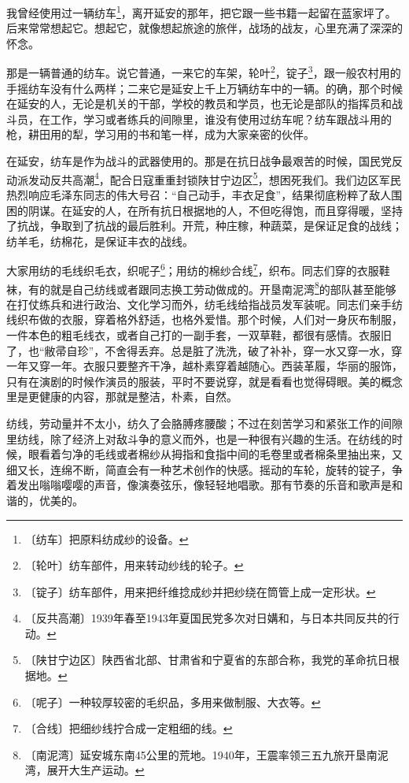\documentclass[12pt,UTF-8,openany]{ctexbook}
\begin{document}
\begin{large}
    
    我曾经使用过一辆纺车\footnote{〔纺车〕把原料纺成纱的设备。}，离开延安的那年，把它跟一些书籍一起留在蓝家坪了。后来常常想起它。想起它，就像想起旅途的旅伴，战场的战友，心里充满了深深的怀念。
    
    那是一辆普通的纺车。说它普通，一来它的车架，轮叶\footnote{〔轮叶〕纺车部件，用来转动纱线的轮子。}，锭子\footnote{〔锭子〕纺车部件，用来把纤维捻成纱并把纱绕在筒管上成一定形状。}，跟一般农村用的手摇纺车没有什么两样；二来它是延安上千上万辆纺车中的一辆。的确，那个时候在延安的人，无论是机关的干部，学校的教员和学员，也无论是部队的指挥员和战斗员，在工作，学习或者练兵的间隙里，谁没有使用过纺车呢？纺车跟战斗用的枪，耕田用的犁，学习用的书和笔一样，成为大家亲密的伙伴。
    
    在延安，纺车是作为战斗的武器使用的。那是在抗日战争最艰苦的时候，国民党反动派发动反共高潮\footnote{〔反共高潮〕1939年春至1943年夏国民党多次对日媾和，与日本共同反共的行动。}，配合日寇重重封锁陕甘宁边区\footnote{〔陕甘宁边区〕陕西省北部、甘肃省和宁夏省的东部合称，我党的革命抗日根据地。}，想困死我们。我们边区军民热烈响应毛泽东同志的伟大号召：“自己动手，丰衣足食”，结果彻底粉粹了敌人围困的阴谋。在延安的人，在所有抗日根据地的人，不但吃得饱，而且穿得暖，坚持了抗战，争取到了抗战的最后胜利。开荒，种庄稼，种蔬菜，是保证足食的战线；纺羊毛，纺棉花，是保证丰衣的战线。
    
    大家用纺的毛线织毛衣，织呢子\footnote{〔呢子〕一种较厚较密的毛织品，多用来做制服、大衣等。}；用纺的棉纱合线\footnote{〔合线〕把细纱线拧合成一定粗细的线。}，织布。同志们穿的衣服鞋袜，有的就是自己纺线或者跟同志换工劳动做成的。开垦南泥湾\footnote{〔南泥湾〕延安城东南45公里的荒地。1940年，王震率领三五九旅开垦南泥湾，展开大生产运动。}的部队甚至能够在打仗练兵和进行政治、文化学习而外，纺毛线给指战员发军装呢。同志们亲手纺线织布做的衣服，穿着格外舒适，也格外爱惜。那个时候，人们对一身灰布制服，一件本色的粗毛线衣，或者自己打的一副手套，一双草鞋，都很有感情。衣服旧了，也“敝帚自珍”，不舍得丢弃。总是脏了洗洗，破了补补，穿一水又穿一水，穿一年又穿一年。衣服只要整齐干净，越朴素穿着越随心。西装革履，华丽的服饰，只有在演剧的时候作演员的服装，平时不要说穿，就是看看也觉得碍眼。美的概念里是更健康的内容，那就是整洁，朴素，自然。
    
    纺线，劳动量并不太小，纺久了会胳膊疼腰酸；不过在刻苦学习和紧张工作的间隙里纺线，除了经济上对敌斗争的意义而外，也是一种很有兴趣的生活。在纺线的时候，眼看着匀净的毛线或者棉纱从拇指和食指中间的毛卷里或者棉条里抽出来，又细又长，连绵不断，简直会有一种艺术创作的快感。摇动的车轮，旋转的锭子，争着发出嗡嗡嘤嘤的声音，像演奏弦乐，像轻轻地唱歌。那有节奏的乐音和歌声是和谐的，优美的。
    

\end{large}
\end{document}
